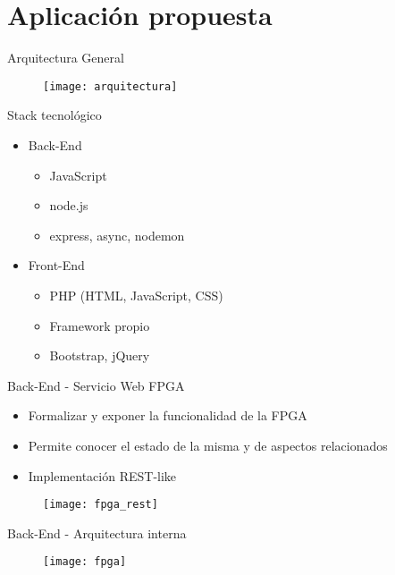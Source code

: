 \section{Aplicación propuesta}

\begin{frame}{Arquitectura General}
  \begin{figure}
    \texttt{[image: arquitectura]}
  \end{figure}
\end{frame}

\begin{frame}{Stack tecnológico}
  \begin{itemize}
    \item Back-End
    \begin{itemize}
      \item JavaScript
      \item node.js
      \item express, async, nodemon
    \end{itemize}
    \item Front-End
    \begin{itemize}
      \item PHP (HTML, JavaScript, CSS)
      \item Framework propio
      \item Bootstrap, jQuery
    \end{itemize}
  \end{itemize}
\end{frame}

\begin{frame}{Back-End - Servicio Web FPGA}
  \begin{itemize}
    \item Formalizar y exponer la funcionalidad de la FPGA
    \item Permite conocer el estado de la misma y de aspectos relacionados
    \item Implementación REST-like
  \end{itemize}
  \begin{figure}
    \texttt{[image: fpga\_rest]}
  \end{figure}
\end{frame}

\begin{frame}{Back-End - Arquitectura interna}
  \begin{figure}
    \texttt{[image: fpga]}
  \end{figure}
\end{frame}

